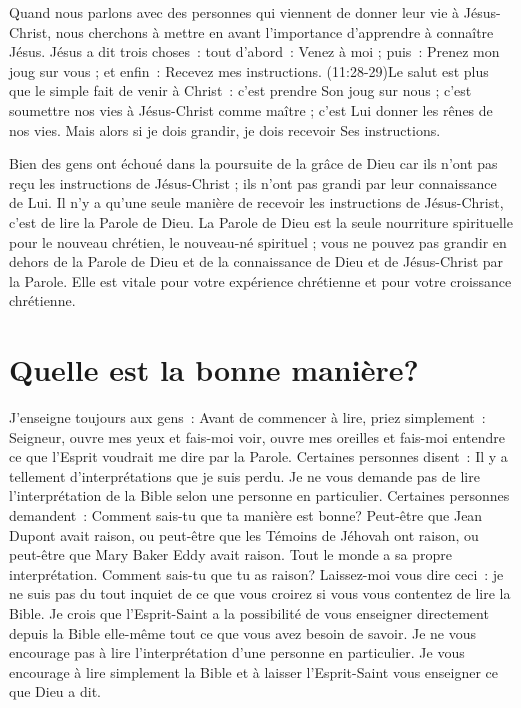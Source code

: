 Quand nous parlons avec des personnes qui viennent de donner leur vie
 à Jésus-Christ, nous cherchons à mettre en avant l'im\-por\-tance d'apprendre
 à connaître Jésus. Jésus a dit trois choses~: tout d'abord~:
 \og Venez à moi \fg{} ; puis~: \og Prenez mon joug sur vous \fg{} ;
 et enfin~: \og Recevez mes instructions. \fg{}
 (11:28-29)Le salut est plus que le simple fait
 de venir à Christ~:
 c'est prendre Son joug sur nous ;
 c'est soumettre nos vies à Jésus-Christ comme maître ;
 c'est Lui donner les rênes de nos vies.
 Mais alors si je dois grandir, je dois recevoir Ses instructions.

Bien des gens ont échoué dans la poursuite de la grâce de Dieu
 car ils n'ont pas reçu les instructions de Jésus-Christ ;
 ils n'ont pas grandi par leur connaissance de Lui.
 Il n'y a qu'une seule manière de recevoir les instructions de Jésus-Christ,
 c'est de lire la Parole de Dieu.
 La Parole de Dieu est la seule nourriture spirituelle pour le nouveau
 chrétien, le nouveau-né spirituel ; vous ne pouvez pas grandir en dehors
 de la Parole de Dieu et de la connaissance de Dieu et de Jésus-Christ
 par la Parole.
 Elle est vitale pour votre expérience chrétienne et pour votre croissance
 chrétienne.


\section{Quelle est la bonne mani\`ere?}

J'enseigne toujours aux gens~:
 \og Avant de commencer à lire, priez simplement~:
 \og Seigneur, ouvre mes yeux et fais-moi voir,
 ouvre mes oreilles et fais-moi entendre ce que l'Esprit
 voudrait me dire par la Parole. \fg{}
 Certaines personnes disent~:
 \og Il y a tellement d'in\-ter\-pré\-ta\-tions que je suis perdu. \fg{}
 Je ne vous demande pas de lire l'interprétation de la Bible
 selon une personne en particulier.
 Certaines personnes demandent~:
 \og Comment sais-tu que ta manière est bonne? Peut-être que Jean Dupont
 avait raison, ou peut-être que les Témoins de Jéhovah ont raison,
 ou peut-être que Mary Baker Eddy avait raison.
 Tout le monde a sa propre interprétation.
 Comment sais-tu que tu as raison? \fg{}
 Laissez-moi vous dire ceci~: je ne suis pas du tout inquiet
 de ce que vous croirez si vous vous contentez de lire la Bible.
 Je crois que l'Esprit-Saint a la possibilité de vous enseigner
 \ocadr directement depuis la Bible elle-même \fcadr{}
 tout ce que vous avez besoin de savoir.
 Je ne vous encourage pas à lire l'interprétation d'une personne
 en particulier. Je vous encourage à lire simplement la Bible
 et à laisser l'Esprit-Saint vous enseigner ce que Dieu a dit.

